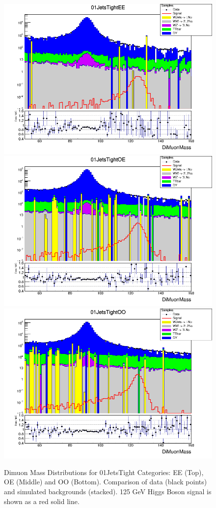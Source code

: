 \begin{figure}[htbp]
  \centering
  \includegraphics[width=0.65\linewidth]{figures/ch_higgs/distributions/baseline_kalman/distribution__01JetsTightEE__DiMuonMass__logY.png}\\
  \includegraphics[width=0.65\linewidth]{figures/ch_higgs/distributions/baseline_kalman/distribution__01JetsTightOE__DiMuonMass__logY.png}\\
  \includegraphics[width=0.65\linewidth]{figures/ch_higgs/distributions/baseline_kalman/distribution__01JetsTightOO__DiMuonMass__logY.png}
  \caption{Dimuon Mass Distributions for 01JetsTight Categories: EE (Top), OE (Middle) and OO (Bottom). Comparison of data (black points) and simulated backgrounds (stacked). 125 GeV Higgs Boson signal is shown as a red solid line.}
  \label{fig:higgs_categorization_01jetstighteeeooo}
\end{figure}
